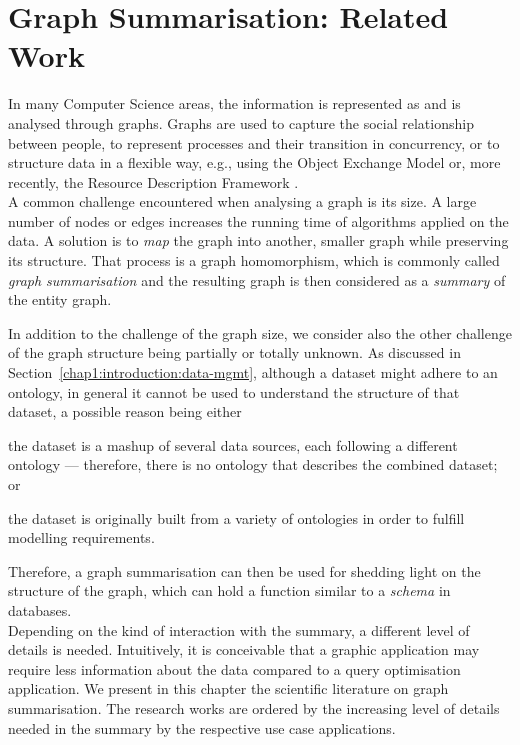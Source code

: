 \chapter{Graph Summarisation: Related Work}
\label{chap3:review}

In many Computer Science areas, the information is represented as and is analysed through graphs. Graphs are used to capture the social relationship between people, to represent processes and their transition in concurrency, or to structure data in a flexible way, e.g., using the Object Exchange Model \cite{papakonstantinou:1995:oea} or, more recently, the Resource Description Framework \cite{rdfconcepts}.\\

A common challenge encountered when analysing a graph is its size. A large number of nodes or edges increases the running time of algorithms applied on the data. A solution is to \emph{map} the graph into another, smaller graph while preserving its structure. That process is a graph homomorphism, which is commonly called \emph{graph summarisation} and the resulting graph is then considered as a \emph{summary} of the entity graph.

In addition to the challenge of the graph size, we consider also the other challenge of the graph structure being partially or totally unknown. As discussed in Section~\ref{chap1:introduction:data-mgmt}, although a dataset might adhere to an ontology, in general it cannot be used to understand the structure of that dataset, a possible reason being either
\begin{inparaenum}[(a)]
\item the dataset is a mashup of several data sources, each following a different ontology --- therefore, there is no ontology that describes the combined dataset; or
\item the dataset is originally built from a variety of ontologies in order to fulfill modelling requirements.
\end{inparaenum}
Therefore, a graph summarisation can then be used for shedding light on the structure of the graph, which can hold a function similar to a \emph{schema} in databases.\\

Depending on the kind of interaction with the summary, a different level of details is needed. Intuitively, it is conceivable that a graphic application may require less information about the data compared to a query optimisation application. We present in this chapter the scientific literature on graph summarisation. The research works are ordered by the increasing level of details needed in the summary by the respective use case applications.

